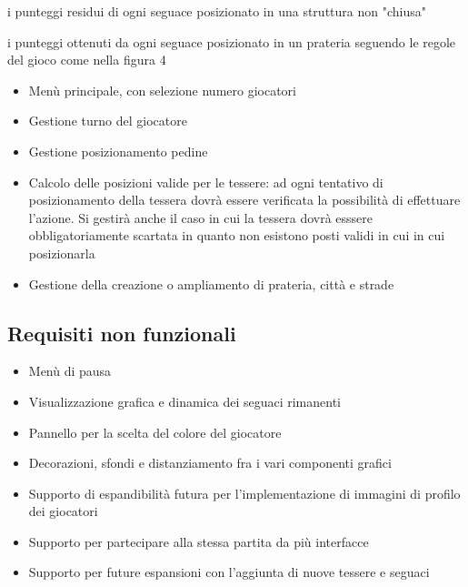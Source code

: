 \subitem i punteggi residui di ogni seguace posizionato in una struttura non "chiusa"

\subitem i punteggi ottenuti da ogni seguace posizionato in un prateria seguendo le regole del gioco come nella figura 4

\begin{itemize}
\item Menù principale, con selezione numero giocatori
\end{itemize}
\begin{itemize}
\item Gestione turno del giocatore
\end{itemize}
\begin{itemize}
\item Gestione posizionamento pedine
\end{itemize}
\begin{itemize}
\item Calcolo delle posizioni valide per le tessere: ad ogni tentativo di posizionamento della tessera dovrà essere verificata la possibilità di effettuare l'azione. Si gestirà anche il caso in cui la tessera dovrà esssere obbligatoriamente scartata in quanto non esistono posti validi in cui in cui posizionarla
\end{itemize}
\begin{itemize}
\item Gestione della creazione o ampliamento di prateria, città e strade
\end{itemize}

\subsection*{Requisiti non funzionali}
\begin{itemize}
\item Menù di pausa
\end{itemize}
\begin{itemize}
\item Visualizzazione grafica e dinamica dei seguaci rimanenti 
\end{itemize}
\begin{itemize}
\item Pannello per la scelta del colore del giocatore
\end{itemize}
\begin{itemize}
\item Decorazioni, sfondi e distanziamento fra i vari componenti grafici
\end{itemize}
\begin{itemize}
\item Supporto di espandibilità futura per l'implementazione di immagini di profilo dei giocatori
\end{itemize}
\begin{itemize}
\item Supporto per partecipare alla stessa partita da più interfacce
\end{itemize}
\begin{itemize}
\item Supporto per future espansioni con l'aggiunta di nuove tessere e seguaci
\end{itemize}

